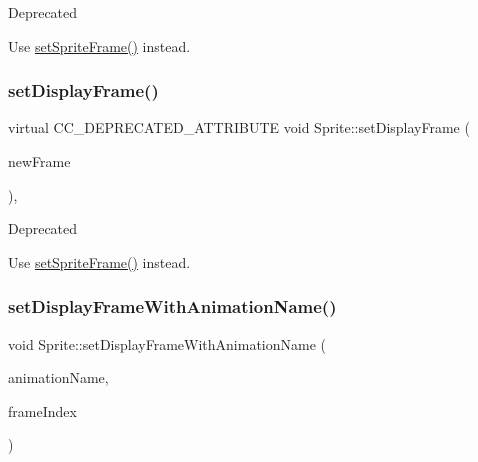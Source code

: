 \begin{DoxyRefDesc}{Deprecated}
\item[\hyperlink{deprecated__deprecated000037}{Deprecated}]Use {\ttfamily \hyperlink{classSprite_a858e1904c720bdea7cb6a6ad512f1195}{set\+Sprite\+Frame()}} instead. \end{DoxyRefDesc}
\mbox{\label{classSprite_adb32a70df269965d534e49600ab9ff13}} 
\subsubsection{\texorpdfstring{set\+Display\+Frame()}{setDisplayFrame()}\hspace{0.1cm}{\footnotesize\ttfamily [2/2]}}
{\footnotesize\ttfamily virtual C\+C\+\_\+\+D\+E\+P\+R\+E\+C\+A\+T\+E\+D\+\_\+\+A\+T\+T\+R\+I\+B\+U\+TE void Sprite\+::set\+Display\+Frame (\begin{DoxyParamCaption}\item[{\hyperlink{classSpriteFrame}{Sprite\+Frame} $\ast$}]{new\+Frame }\end{DoxyParamCaption})\hspace{0.3cm}{\ttfamily [inline]}, {\ttfamily [virtual]}}

\begin{DoxyRefDesc}{Deprecated}
\item[\hyperlink{deprecated__deprecated000267}{Deprecated}]Use {\ttfamily \hyperlink{classSprite_a858e1904c720bdea7cb6a6ad512f1195}{set\+Sprite\+Frame()}} instead. \end{DoxyRefDesc}
\mbox{\label{classSprite_afebc449247fe0a48430e72bdb2a801e8}} 
\subsubsection{\texorpdfstring{set\+Display\+Frame\+With\+Animation\+Name()}{setDisplayFrameWithAnimationName()}\hspace{0.1cm}{\footnotesize\ttfamily [1/2]}}
{\footnotesize\ttfamily void Sprite\+::set\+Display\+Frame\+With\+Animation\+Name (\begin{DoxyParamCaption}\item[{const std\+::string \&}]{animation\+Name,  }\item[{ssize\+\_\+t}]{frame\+Index }\end{DoxyParamCaption})\hspace{0.3cm}{\ttfamily [virtual]}}

